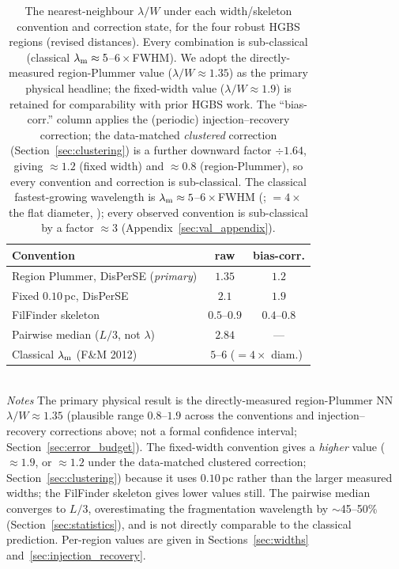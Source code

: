 \documentclass[usenatbib,twoside,twocolumn]{mnras}
\begin{document}
\begin{table}
\caption{The nearest-neighbour $\lambda/W$ under each width/skeleton convention and correction state, for the four robust HGBS regions (revised distances). Every combination is sub-classical (classical $\lambda_{\rm m}\approx5$--$6\times$FWHM). We adopt the directly-measured region-Plummer value ($\lambda/W\approx1.35$) as the primary physical headline; the fixed-width value ($\lambda/W\approx1.9$) is retained for comparability with prior HGBS work. The ``bias-corr.'' column applies the (periodic) injection--recovery correction; the data-matched \emph{clustered} correction (Section~\ref{sec:clustering}) is a further downward factor $\div1.64$, giving $\approx1.2$ (fixed width) and $\approx0.8$ (region-Plummer), so every convention and correction is sub-classical. The classical fastest-growing wavelength is $\lambda_{\rm m}\approx5$--$6\times$FWHM (\citealt{Fischera2012}; $=4\times$ the flat diameter, \citealt{Inutsuka1992}); every observed convention is sub-classical by a factor $\approx3$ (Appendix~\ref{sec:val_appendix}).}
\label{tab:headline}
\footnotesize
\setlength{\tabcolsep}{4pt}
\begin{tabular}{p{4.1cm}cc}
\toprule
Convention & raw & bias-corr. \\
\midrule
Region Plummer, DisPerSE (\emph{primary}) & $1.35$ & $1.2$ \\
Fixed $0.10$\,pc, DisPerSE & $2.1$ & $1.9$ \\
FilFinder skeleton & $0.5$--$0.9$ & $0.4$--$0.8$ \\
Pairwise median ($L/3$, not $\lambda$) & $2.84$ & --- \\
\midrule
Classical $\lambda_{\rm m}$ (F\&M 2012) & \multicolumn{2}{c}{$5$--$6$ ($=4\times$ diam.)} \\
\bottomrule
\end{tabular}
\\[2pt]
\footnotesize
\emph{Notes} The primary physical result is the directly-measured region-Plummer NN $\lambda/W\approx1.35$ (plausible range $0.8$--$1.9$ across the conventions and injection--recovery corrections above; not a formal confidence interval; Section~\ref{sec:error_budget}). The fixed-width convention gives a \emph{higher} value ($\approx1.9$, or $\approx1.2$ under the data-matched clustered correction; Section~\ref{sec:clustering}) because it uses $0.10$\,pc rather than the larger measured widths; the FilFinder skeleton gives lower values still. The pairwise median converges to $L/3$, overestimating the fragmentation wavelength by $\sim$45--50\% (Section~\ref{sec:statistics}), and is not directly comparable to the classical prediction. Per-region values are given in Sections~\ref{sec:widths} and~\ref{sec:injection_recovery}.
\end{table}
\end{document}
